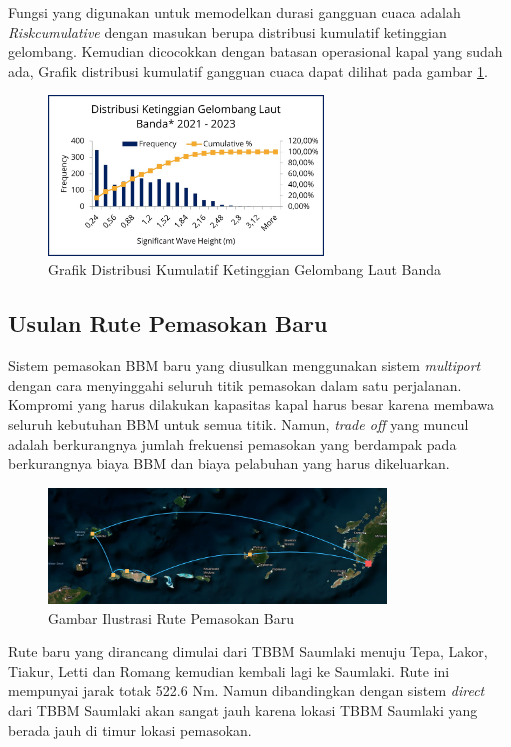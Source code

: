 Fungsi yang digunakan untuk memodelkan durasi gangguan cuaca adalah \emph{Riskcumulative} dengan masukan berupa distribusi kumulatif ketinggian gelombang. Kemudian dicocokkan dengan batasan operasional kapal yang sudah ada, Grafik distribusi kumulatif gangguan cuaca dapat dilihat pada gambar \ref{fig:grafik-kumulatif-durasi-gangguan-cuaca-1st}.

\begin{figure}[htbp!]
    \centering
    \includegraphics[width=0.65\textwidth]{grafik/distribusi-gelombang-kabupaten-mbd.jpg}
    \caption{Grafik Distribusi Kumulatif Ketinggian Gelombang Laut Banda}
    \label{fig:grafik-kumulatif-durasi-gangguan-cuaca-1st}
\end{figure}

\subsection{Usulan Rute Pemasokan Baru}
\label{subsec:usulan-rute-baru}

    Sistem pemasokan BBM baru yang diusulkan menggunakan sistem \emph{multiport} dengan cara menyinggahi seluruh titik pemasokan dalam satu perjalanan. Kompromi yang harus dilakukan kapasitas kapal harus besar karena membawa seluruh kebutuhan BBM untuk semua titik. Namun, \emph{trade off} yang muncul adalah berkurangnya jumlah frekuensi pemasokan yang berdampak pada berkurangnya biaya BBM dan biaya pelabuhan yang harus dikeluarkan.

\begin{figure}[htbp!]
    \centering
    \includegraphics[width=0.8\textwidth]{gambar/rute-baru.png}
    \caption{Gambar Ilustrasi Rute Pemasokan Baru}
    \label{fig:rute-baru}
\end{figure}

    Rute baru yang dirancang dimulai dari TBBM Saumlaki menuju Tepa, Lakor, Tiakur, Letti dan Romang kemudian kembali lagi ke Saumlaki. Rute ini mempunyai jarak totak 522.6 Nm. Namun dibandingkan dengan sistem \emph{direct} dari TBBM Saumlaki akan sangat jauh karena lokasi TBBM Saumlaki yang berada jauh di timur lokasi pemasokan.